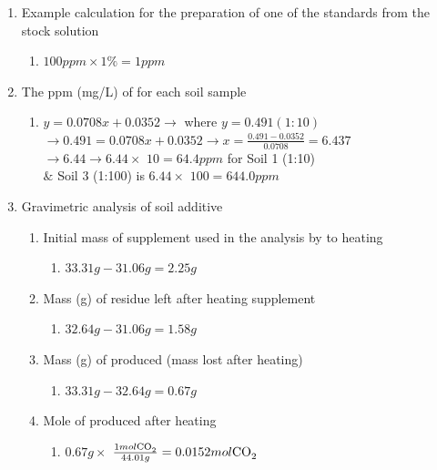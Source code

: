 \documentclass[10pt]{article}
\begin{document}
\begin{enumerate}
    \item Example calculation for the preparation of one of the  standards from the stock  solution
    \begin{enumerate}
        \item $100 ppm \times 1\% = 1 ppm$
    \end{enumerate}
    \item The ppm (mg/L) of  for each soil sample
    \begin{enumerate}
        \item $y = 0.0708x + 0.0352 \longrightarrow$ where $y = 0.491 (1:10)$\\$\longrightarrow 0.491 = 0.0708x + 0.0352 \longrightarrow x = \frac{0.491 - 0.0352}{0.0708} = 6.437$ \\ $\longrightarrow 6.44 \longrightarrow 6.44 \times$ $ 10 = 64.4 ppm$ for Soil 1 (1:10) \\ $\&$ Soil 3 (1:100) is $6.44 \times $ $100 = 644.0 ppm$
    \end{enumerate}
    \item Gravimetric analysis of soil additive
    \begin{enumerate}
        \item Initial mass of supplement used in the analysis by to heating
        \begin{enumerate}
            \item $33.31g -31.06g = 2.25g$
        \end{enumerate}
        \item Mass (g) of residue left after heating supplement
        \begin{enumerate}
            \item $32.64g - 31.06g = 1.58g$
        \end{enumerate}
        \item Mass (g) of  produced (mass lost after heating)
        \begin{enumerate}
            \item $33.31g - 32.64g = 0.67g$
        \end{enumerate}
        \item Mole of  produced after heating
        \begin{enumerate}
            \item $0.67g \times$ $ \frac{1 mol \ce{CO_2}}{44.01g} = 0.0152 mol \ce{CO_2}$
        \end{enumerate}

\end{enumerate}
\end{enumerate}
\end{document}
